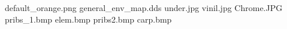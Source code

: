 default_orange.png
general_env_map.dds
under.jpg
vinil.jpg
Chrome.JPG
pribs_1.bmp
elem.bmp
pribs2.bmp
carp.bmp
